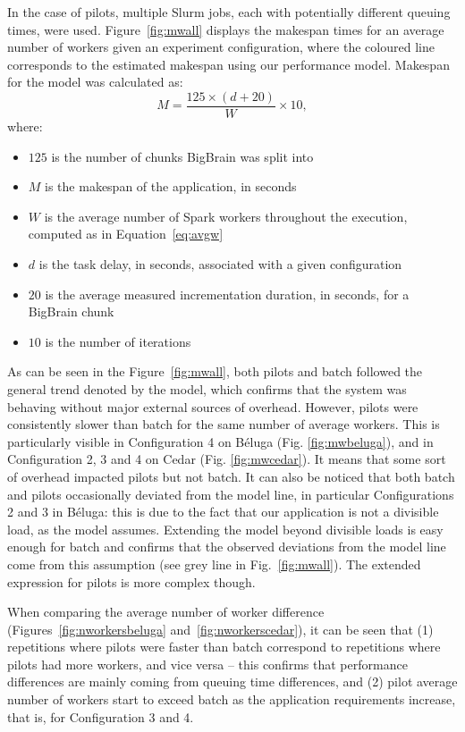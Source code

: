     
    In the case of pilots, multiple Slurm jobs, each with potentially different queuing times,
    were used. Figure~\ref{fig:mwall} displays the makespan times for an average number of workers
    given an experiment configuration, where the coloured line corresponds to the estimated makespan using 
    our performance model. Makespan for the model was calculated as:
    $$
    M = \frac{125\times(d + 20)}{W}\times 10,
    $$
    where:
    \begin{itemize}
	\item $125$ is the number of chunks BigBrain was split into
	\item $M$ is the makespan of the application, in seconds
	\item $W$ is the average number of Spark workers throughout the execution, computed as in Equation~\ref{eq:avgw}
	\item $d$ is the task delay, in seconds, associated with a given configuration
	\item $20$ is the average measured incrementation duration, in seconds, for a BigBrain chunk
	\item $10$ is the number of iterations
    \end{itemize}
    As can be seen in the Figure~\ref{fig:mwall}, both pilots and batch 
    followed the general trend denoted by the model, which confirms that 
    the system was behaving without major external sources of
    overhead. However, pilots were consistently slower than batch for the same
    number of average workers. This is particularly visible in Configuration 4
    on B\'eluga (Fig. \ref{fig:mwbeluga}), and in Configuration 2, 3 and 4 on
    Cedar (Fig. \ref{fig:mwcedar}). It means that some sort of overhead
    impacted pilots but not batch. It can also be noticed that both batch and
    pilots occasionally deviated from the model line, in particular
    Configurations 2 and 3 in B\'eluga: this is due to the fact that our
    application is not a divisible load, as the model assumes. Extending the
    model beyond divisible loads is easy enough for batch and confirms that the
    observed deviations from the model line come from this assumption (see grey
    line in Fig.~\ref{fig:mwall}). The extended expression for pilots is more complex
    though.
    
    When
    comparing the average number of worker difference
    (Figures~\ref{fig:nworkersbeluga} and~\ref{fig:nworkerscedar}), it can be
    seen that (1) repetitions where pilots were faster than batch correspond
    to repetitions where pilots had more workers, and vice versa -- this
    confirms that performance differences are mainly coming from queuing time
    differences, and (2) pilot average number of workers start to exceed batch
    as the application requirements increase, that is, for Configuration 3 and
    4.
    
